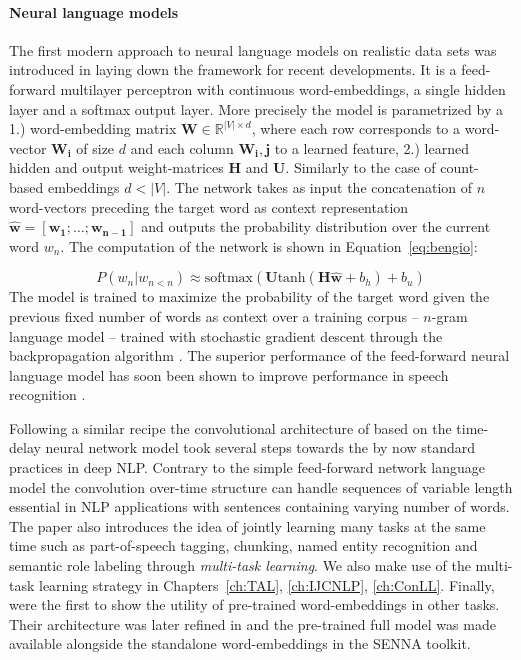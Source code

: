 \paragraph{Neural language models}
The first modern approach to neural language models on realistic data sets was introduced
in \cite{bengio2003neural} laying down the framework for recent developments.
It is a feed-forward multilayer perceptron with continuous word-embeddings,
a single hidden layer and a softmax output layer.
More precisely the model is parametrized by a 1.) word-embedding matrix
$\mathbf{W} \in \mathbb{R}^{|V| \times d}$, where each row corresponds to a word-vector
$\mathbf{W_i}$ of size $d$ and each column $\mathbf{W_i,j}$ to a learned feature, 2.)
learned hidden and output weight-matrices $\mathbf{H}$ and $\mathbf{U}$. Similarly
to the case of count-based embeddings $d < |V|$.
The network takes as input the concatenation of $n$ word-vectors preceding the target word as context
representation $\hat{\mathbf{w}} = [\mathbf{w_1}; \ldots; \mathbf{w_{n-1}}]$
and outputs the probability distribution over the current word $w_n$.
The computation of the network is shown in Equation~\ref{eq:bengio}:

\begin{equation}
\label{eq:bengio}
P(w_n|w_{n<n}) \approx \text{softmax}(\mathbf{U} \text{tanh}(\mathbf{H} \mathbf{\hat{w}} + b_h ) + b_u)
\end{equation}
The model is trained to maximize the probability of
the target word given the previous fixed number of words as context over a training corpus
-- $n$-gram language model -- trained with stochastic gradient descent \citep{cauchy1847methode}
through the backpropagation algorithm \citep{rumelhart1985learning}.
The superior performance of the feed-forward neural language model has soon been shown to
improve performance in speech recognition \citep{schwenk2005training}.

Following a similar recipe the convolutional architecture of \cite{collobert2008unified}
based on the time-delay neural network model \citep{waibel1990phoneme} took several steps towards the
by now standard practices in deep NLP.
Contrary to the simple feed-forward network language model the convolution over-time structure can handle
sequences of variable length essential in NLP applications with sentences containing varying number of words.
The paper also introduces the idea of jointly learning many tasks at the same time such as part-of-speech
tagging, chunking, named entity recognition and semantic role labeling through \emph{multi-task learning}.
We also make use of the multi-task learning strategy in Chapters~\ref{ch:TAL}, \ref{ch:IJCNLP}, \ref{ch:ConLL}.
Finally, \cite{collobert2008unified} were the first to show the utility of pre-trained word-embeddings
in other tasks. Their architecture was later refined in \cite{collobert2011natural} and the pre-trained
full model was made available alongside the standalone word-embeddings in the SENNA toolkit.


